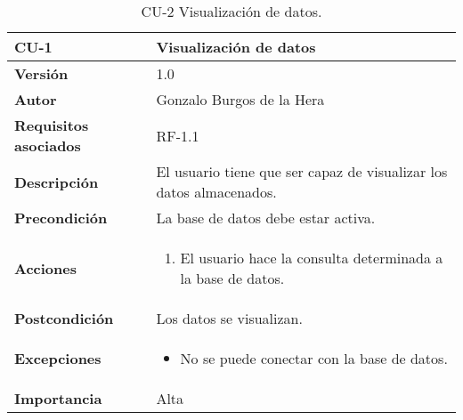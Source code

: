 \begin{table}[H]
	\centering
	\begin{tabularx}{\linewidth}{ p{} p{} }
		\toprule
		\textbf{CU-1}    & \textbf{Visualización de datos}\\
		\toprule
		\textbf{Versión}              & 1.0    \\
		\textbf{Autor}                & Gonzalo Burgos de la Hera \\
		\textbf{Requisitos asociados} & RF-1.1 \\
		\textbf{Descripción}          & El usuario tiene que ser capaz de visualizar los datos almacenados. \\
		\textbf{Precondición}         & La base de datos debe estar activa. \\
		\textbf{Acciones}             &
		\begin{enumerate}
			\def\labelenumi{\arabic{enumi}.}
			\tightlist
			\item El usuario hace la consulta determinada a la base de datos.
		\end{enumerate}\\
		\textbf{Postcondición}        & Los datos se visualizan. \\
		\textbf{Excepciones}          & 
        \begin{itemize}
			\tightlist
			\item No se puede conectar con la base de datos.
        \end{itemize} \\
		\textbf{Importancia}          & Alta \\
		\bottomrule
	\end{tabularx}
	\caption{CU-2 Visualización de datos.}
\end{table}

